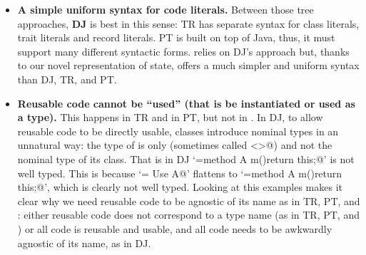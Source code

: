 \begin{itemize}
\item {\bf A simple uniform syntax for code literals.}
Between those tree approaches, \textbf{DJ} is best in this sense: TR has separate syntax for class literals, trait literals and record literals.
PT is built on top of Java, thus, it must support many different syntactic forms.
\name relies on DJ's approach but,
thanks to our novel representation of state, \name offers a much simpler and uniform syntax than
DJ, TR, and PT.
\item 
{\bf Reusable code cannot be ``used'' (that is be instantiated or used as a type).}
This happens in TR and in PT, but not in . In DJ, to allow reusable code to be directly 
usable, 
classes introduce nominal types in an unnatural way: the type of
\Q@this@ is only \Q@This@ (sometimes called \Q@<>@) and not the
nominal type of its class. 
That is in DJ 
`\Q@A={method A m(){return this;}}@' is not well typed. This is because
`\Q@B= Use A@' flattens to `\Q@B={method A m(){return this;}}@', which is clearly not well typed.
Looking at this examples makes it clear
 why we need reusable code to be agnostic of its name as in  TR, PT, and \name:
either reusable code does  not correspond to a type name (as in TR, PT, and \name)
or all code is reusable and usable, and all code needs to be awkwardly agnostic of its name, as in DJ.


\end{itemize}

